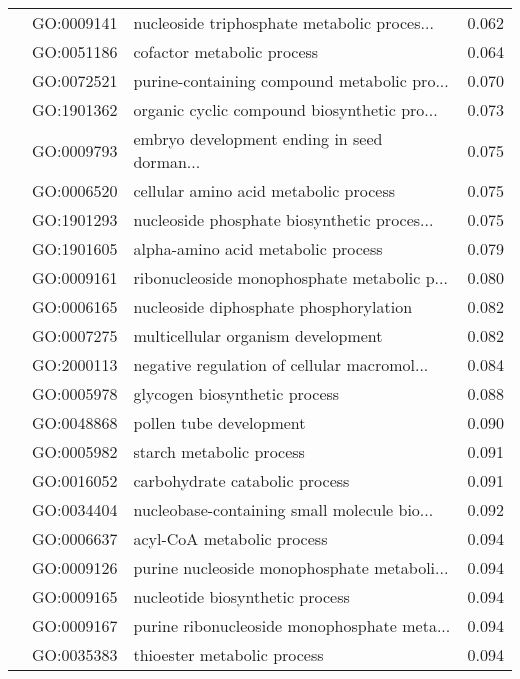\begin{longtable}{lllr}
   & GO:0009141 &  nucleoside triphosphate metabolic proces... &         0.062 \\
   & GO:0051186 &                   cofactor metabolic process &         0.064 \\
   & GO:0072521 &  purine-containing compound metabolic pro... &         0.070 \\
   & GO:1901362 &  organic cyclic compound biosynthetic pro... &         0.073 \\
   & GO:0009793 &  embryo development ending in seed dorman... &         0.075 \\
   & GO:0006520 &        cellular amino acid metabolic process &         0.075 \\
   & GO:1901293 &  nucleoside phosphate biosynthetic proces... &         0.075 \\
   & GO:1901605 &           alpha-amino acid metabolic process &         0.079 \\
   & GO:0009161 &  ribonucleoside monophosphate metabolic p... &         0.080 \\
   & GO:0006165 &       nucleoside diphosphate phosphorylation &         0.082 \\
   & GO:0007275 &           multicellular organism development &         0.082 \\
   & GO:2000113 &  negative regulation of cellular macromol... &         0.084 \\
   & GO:0005978 &                glycogen biosynthetic process &         0.088 \\
   & GO:0048868 &                      pollen tube development &         0.090 \\
   & GO:0005982 &                     starch metabolic process &         0.091 \\
   & GO:0016052 &               carbohydrate catabolic process &         0.091 \\
   & GO:0034404 &  nucleobase-containing small molecule bio... &         0.092 \\
   & GO:0006637 &                   acyl-CoA metabolic process &         0.094 \\
   & GO:0009126 &  purine nucleoside monophosphate metaboli... &         0.094 \\
   & GO:0009165 &              nucleotide biosynthetic process &         0.094 \\
   & GO:0009167 &  purine ribonucleoside monophosphate meta... &         0.094 \\
   & GO:0035383 &                  thioester metabolic process &         0.094 \\

\end{longtable}
